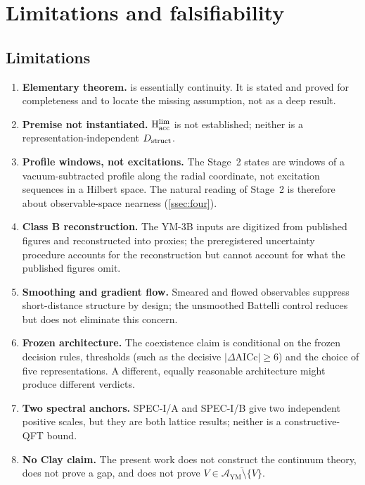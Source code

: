 \documentclass[11pt,a4paper]{article}
\theoremstyle{definition}
\theoremstyle{remark}
\newcommand{\AYM}{\mathcal{A}_{\mathrm{YM}}}
\newcommand{\Hacc}{\mathrm{H}_{\mathrm{acc}}}
\begin{document}
\section{Limitations and falsifiability}\label{sec:limits}

\subsection{Limitations}\label{ssec:limitations}
\begin{enumerate}[label=(L\arabic*)]
\item \textbf{Elementary theorem.}  is essentially continuity. It is stated and proved for completeness and to locate the missing assumption, not as a deep result.
\item \textbf{Premise not instantiated.} $\Hacc^{\rm lim}$ is not established; neither is a representation-independent $D_{\rm struct}$.
\item \textbf{Profile windows, not excitations.} The Stage~2 states are windows of a vacuum-subtracted profile along the radial coordinate, not excitation sequences in a Hilbert space. The natural reading of Stage~2 is therefore about observable-space nearness (\cref{ssec:four}).
\item \textbf{Class B reconstruction.} The YM-3B inputs are digitized from published figures and reconstructed into proxies; the preregistered uncertainty procedure accounts for the reconstruction but cannot account for what the published figures omit.
\item \textbf{Smoothing and gradient flow.} Smeared and flowed observables suppress short-distance structure by design; the unsmoothed Battelli control reduces but does not eliminate this concern.
\item \textbf{Frozen architecture.} The coexistence claim is conditional on the frozen decision rules, thresholds (such as the decisive $|\Delta\mathrm{AICc}|\ge6$) and the choice of five representations. A different, equally reasonable architecture might produce different verdicts.
\item \textbf{Two spectral anchors.} SPEC-I/A and SPEC-I/B give two independent positive scales, but they are both lattice results; neither is a constructive-QFT bound.
\item \textbf{No Clay claim.} The present work does not construct the continuum theory, does not prove a gap, and does not prove $V\in\overline{\AYM\setminus\{V\}}$.
\end{enumerate}
\end{document}
